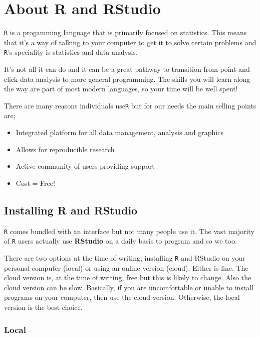 \documentclass[]{book}
\providecommand{\tightlist}{%
  \setlength{\itemsep}{0pt}\setlength{\parskip}{0pt}}
\begin{document}
\hypertarget{about-r-and-rstudio}{%
\section{About R and RStudio}\label{about-r-and-rstudio}}

\texttt{R} is a progamming language that is primarily focused on statistics. This means that it's a way of talking to your computer to get it to solve certain problems and \texttt{R}'s speciality is statistics and data analysis.

It's not all it can do and it can be a great pathway to transition from point-and-click data analysis to more general programming. The skills you will learn along the way are part of most modern languages, so your time will be well spent!

There are many reasons individuals use\texttt{R} but for our needs the main selling points are;

\begin{itemize}
\tightlist
\item
  Integrated platform for all data management, analysis and graphics
\item
  Allows for reproducible research
\item
  Active community of users providing support
\item
  Cost = Free!
\end{itemize}

\hypertarget{installing-r-and-rstudio}{%
\subsection{Installing R and RStudio}\label{installing-r-and-rstudio}}

\texttt{R} comes bundled with an interface but not many people use it. The vast majority of \texttt{R} users actually use \textbf{RStudio} on a daily basis to program and so we too.

There are two options at the time of writing; installing \texttt{R} and RStudio on your personal computer (local) or using an online version (cloud). Either is fine. The cloud version is, at the time of writing, free but this is likely to change. Also the cloud version can be slow. Basically, if you are uncomfortable or unable to install programs on your computer, then use the cloud version. Otherwise, the local version is the best choice.

\hypertarget{local}{%
\subsubsection{Local}\label{local}}
\end{document}
